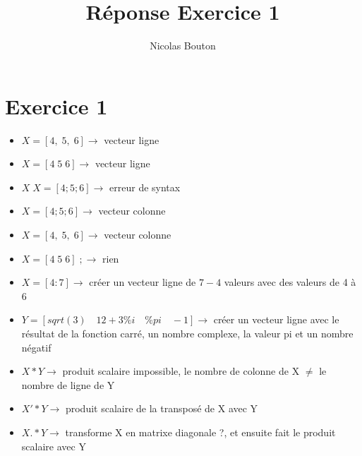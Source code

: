 \documentclass[12pt, letterpaper]{article}
\title{Réponse Exercice 1}
\author{Nicolas Bouton}
\begin{document}
\begin{titlepage}
\maketitle
\end{titlepage}

\section{Exercice 1}

\begin{itemize}
\item $X = [4,\; 5, \; 6] \rightarrow$ vecteur ligne
\item $X = [4 \; 5 \; 6] \rightarrow$ vecteur ligne
\item $X\;X = [4;5;6] \rightarrow$ erreur de syntax
\item $X = [4;5;6] \rightarrow$ vecteur colonne
\item $X = [4, \; 5, \; 6] \rightarrow$ vecteur colonne
\item $X = [4 \; 5 \; 6] \; ; \rightarrow$ rien
\item $X = [4:7] \rightarrow$ créer un vecteur ligne de $7-4$ valeurs avec des valeurs de 4 à 6
\item $Y = [sqrt(3) \quad 12+3\%i \quad \%pi \quad -1] \rightarrow$ créer un vecteur ligne avec le résultat de la fonction carré, un nombre complexe, la valeur pi et un nombre négatif
\item $X*Y \rightarrow$ produit scalaire impossible, le nombre de colonne de X $\neq$ le nombre de ligne de Y
\item $X'*Y \rightarrow$ produit scalaire de la transposé de X avec Y
\item $X.*Y \rightarrow$ transforme X en matrixe diagonale ?, et ensuite fait le produit scalaire avec Y
  
\end{itemize}
\end{document}
